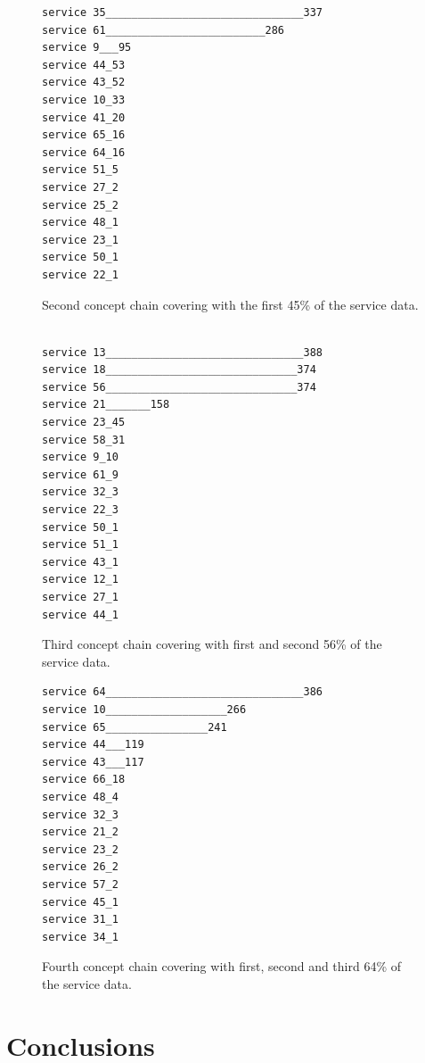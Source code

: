 \documentclass[acmconf,authordraft]{acmart}
\begin{document}
\begin{figure}[!htb]
\vspace{.5cm}
\begin{verbatim}
service 35_______________________________337
service 61_________________________286
service 9___95
service 44_53
service 43_52
service 10_33
service 41_20
service 65_16
service 64_16
service 51_5
service 27_2
service 25_2
service 48_1
service 23_1
service 50_1
service 22_1
\end{verbatim}

\caption{Second concept chain covering with the first 45\% of the service data.}
\label{fig:ccc_2}
\end{figure}

\begin{figure}[!htb]
\vspace{.5cm}
\begin{verbatim}

service 13_______________________________388
service 18______________________________374
service 56______________________________374
service 21_______158
service 23_45
service 58_31
service 9_10
service 61_9
service 32_3
service 22_3
service 50_1
service 51_1
service 43_1
service 12_1
service 27_1
service 44_1
\end{verbatim}

\caption{Third concept chain covering with first and second 56\% of the service data.}
\label{fig:ccc_3}
\end{figure}


\begin{figure}[!htb]
\vspace{.5cm}
\begin{verbatim}
service 64_______________________________386
service 10___________________266
service 65________________241
service 44___119
service 43___117
service 66_18
service 48_4
service 32_3
service 21_2
service 23_2
service 26_2
service 57_2
service 45_1
service 31_1
service 34_1
\end{verbatim}

\caption{Fourth concept chain covering with first, second and third 64\% of the service data.}
\label{fig:ccc_4}
\end{figure}

\section{Conclusions}





\end{document}
